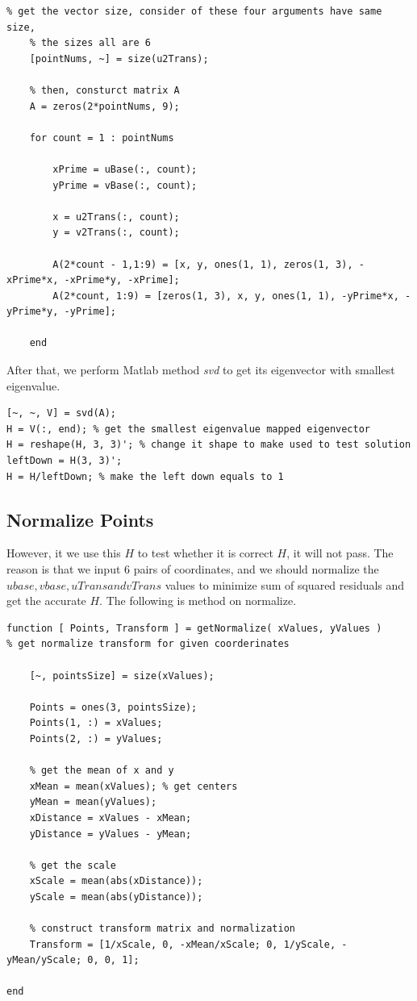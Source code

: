 \documentclass[12pt]{article}
\begin{document}
\begin{lstlisting}
% get the vector size, consider of these four arguments have same size,
    % the sizes all are 6
    [pointNums, ~] = size(u2Trans);
    
    % then, consturct matrix A
    A = zeros(2*pointNums, 9);
    
    for count = 1 : pointNums
        
        xPrime = uBase(:, count);
        yPrime = vBase(:, count);
        
        x = u2Trans(:, count);
        y = v2Trans(:, count);
        
        A(2*count - 1,1:9) = [x, y, ones(1, 1), zeros(1, 3), -xPrime*x, -xPrime*y, -xPrime];
        A(2*count, 1:9) = [zeros(1, 3), x, y, ones(1, 1), -yPrime*x, -yPrime*y, -yPrime];
        
    end
\end{lstlisting}

After that, we perform Matlab method \textit{svd} to get its eigenvector with smallest eigenvalue.

\begin{lstlisting}
[~, ~, V] = svd(A);
H = V(:, end); % get the smallest eigenvalue mapped eigenvector
H = reshape(H, 3, 3)'; % change it shape to make used to test solution
leftDown = H(3, 3)';
H = H/leftDown; % make the left down equals to 1
\end{lstlisting}

\subsection{Normalize Points}

However, it we use this $H$ to test whether it is correct $H$, it will not pass. The reason is that we input $6$ pairs of coordinates, and we should normalize the $ubase, vbase, uTrans and vTrans$ values to minimize sum of squared residuals and get the accurate $H$. The following is method on normalize.

\begin{lstlisting}
function [ Points, Transform ] = getNormalize( xValues, yValues )
% get normalize transform for given coorderinates
    
    [~, pointsSize] = size(xValues);
    
    Points = ones(3, pointsSize);
    Points(1, :) = xValues;
    Points(2, :) = yValues;

    % get the mean of x and y
    xMean = mean(xValues); % get centers
    yMean = mean(yValues);
    xDistance = xValues - xMean;
    yDistance = yValues - yMean;

    % get the scale
    xScale = mean(abs(xDistance));
    yScale = mean(abs(yDistance));

    % construct transform matrix and normalization
    Transform = [1/xScale, 0, -xMean/xScale; 0, 1/yScale, -yMean/yScale; 0, 0, 1];
    
end

\end{lstlisting}
\end{document}
